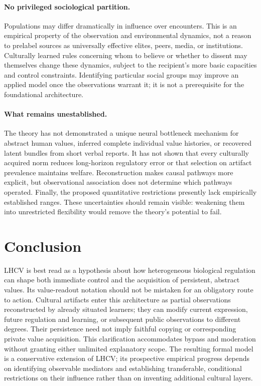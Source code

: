 \documentclass[11pt,a4paper]{article}
\begin{document}
\paragraph{No privileged sociological partition.}
Populations may differ dramatically in influence over encounters. This is an empirical property of the observation and environmental dynamics, not a reason to prelabel sources as universally effective elites, peers, media, or institutions. Culturally learned rules concerning whom to believe or whether to dissent may themselves change these dynamics, subject to the recipient's more basic capacities and control constraints. Identifying particular social groups may improve an applied model once the observations warrant it; it is not a prerequisite for the foundational architecture.

\paragraph{What remains unestablished.}
The theory has not demonstrated a unique neural bottleneck mechanism for abstract human values, inferred complete individual value histories, or recovered latent bundles from short verbal reports. It has not shown that every culturally acquired norm reduces long-horizon regulatory error or that selection on artifact prevalence maintains welfare. Reconstruction makes causal pathways more explicit, but observational association does not determine which pathways operated. Finally, the proposed quantitative restrictions presently lack empirically established ranges. These uncertainties should remain visible: weakening them into unrestricted flexibility would remove the theory's potential to fail.

\section{Conclusion}
LHCV is best read as a hypothesis about how heterogeneous biological regulation can shape both immediate control and the acquisition of persistent, abstract values. Its value-readout notation should not be mistaken for an obligatory route to action. Cultural artifacts enter this architecture as partial observations reconstructed by already situated learners; they can modify current expression, future regulation and learning, or subsequent public observations to different degrees. Their persistence need not imply faithful copying or corresponding private value acquisition. This clarification accommodates bypass and moderation without granting either unlimited explanatory scope. The resulting formal model is a conservative extension of LHCV; its prospective empirical progress depends on identifying observable mediators and establishing transferable, conditional restrictions on their influence rather than on inventing additional cultural layers.



\end{document}

